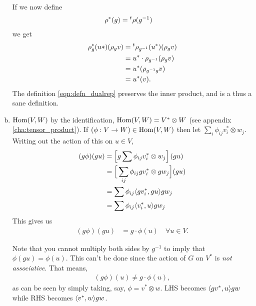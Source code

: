 \begin{enumerate}[(a)]
        If we now define
        \begin{align}
            \rho^*(g) &= \prescript{t}{}\rho(g^{-1})
            \label{eqn:defn_dualrep}
        \end{align}
        we get
        \begin{align*}
            \rho_g^*(u*)(\rho_g v) &= \prescript{t}{}\rho_{g^{-1}}(u^*)(\rho_g v)\\
                &= u^*\cdot\rho_{g^{-1}} (\rho_g v) \\
                &= u^* (\rho_{g^{-1}g} v) \\
                &= u^*(v).
        \end{align*}
        The definition \eqref{eqn:defn_dualrep} preserves the inner product, and is a thus a sane definition.
    \item $\operatorname{Hom}(V,W)$ by the identification, $\operatorname{Hom}(V,W)=V^*\otimes W$ (see appendix \ref{cha:tensor_product}). If $(\phi: V\to W)\in \operatorname{Hom}(V,W)$ then let $\sum_i \phi_{ij} v_i^*\otimes w_j$. Writing out the action of this on $u\in V$,
        \begin{align*}
            (g\phi)(gu) &= \left[ g \sum\phi_{ij} v^*_i \otimes w_j \right] (gu) \\
                &= \Big[ \sum_{ij}\phi_{ij} gv^*_i \otimes gw_j \Big] (gu) \\
                &= \sum \phi_{ij} \langle gv_i^*, gu\rangle g w_j\\
                &= \sum \phi_{ij} \langle v_i^*, u\rangle g w_j\\
        \end{align*}
        This gives us
        \begin{align}
            (g\phi)(gu) &= g\cdot\phi(u)\quad \forall u\in  V.
            \label{eqn:linearmap_groupaction}
        \end{align}
        \begin{insight}
            Note that you cannot multiply both sides by $g^{-1}$ to imply that $\phi(gu)=\phi(u)$. This can't be done since the action of $G$ on $V^*$ is \emph{not associative}. That means,
            \begin{align*}
                (g\phi)(u) \neq g\cdot \phi(u),
            \end{align*}
            as can be seen by simply taking, say, $\phi=v^*\otimes w$. LHS becomes $\langle gv^*, u \rangle gw$ while RHS becomes $\langle v^*,w\rangle gw$.
        \end{insight}
        \begin{center}
\end{center}
\end{enumerate}
